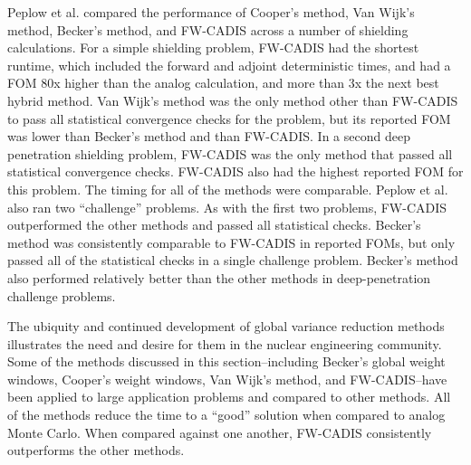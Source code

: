 Peplow et al. \cite{peplow_comparison_2012} compared the performance of
Cooper's method, Van Wijk's method, Becker's method, and FW-CADIS
across a number of shielding calculations. For a simple shielding
problem, FW-CADIS had the shortest runtime, which included the forward and
adjoint deterministic times, and had a FOM 80x higher than the analog
calculation, and more than 3x the next best hybrid method. Van Wijk's method was
the only method other than FW-CADIS to pass all statistical convergence checks
for the problem, but its reported FOM was lower than Becker's method and than
FW-CADIS. In a second deep penetration shielding problem, FW-CADIS was the
only method
that passed all statistical convergence checks. FW-CADIS also had the highest
reported FOM for this problem. The timing for all of the methods were
comparable. Peplow et al. also ran two ``challenge'' problems. As with the first
two problems, FW-CADIS outperformed the other methods and passed all statistical
checks. Becker's method was
consistently comparable to FW-CADIS in reported FOMs, but only passed all of the
statistical checks in a single challenge problem. Becker's method also performed
relatively better than the other methods in deep-penetration challenge problems.

The ubiquity and continued development of global variance reduction methods
illustrates the need and desire for them in the nuclear engineering community.
Some of the
methods discussed in this section--including Becker's global weight windows,
Cooper's weight windows, Van Wijk's method, and FW-CADIS--have
been applied to large application problems and compared to other methods.
All of the methods reduce the time to a ``good'' solution when
compared to analog Monte Carlo. When compared against one another, FW-CADIS
consistently outperforms the other methods.
